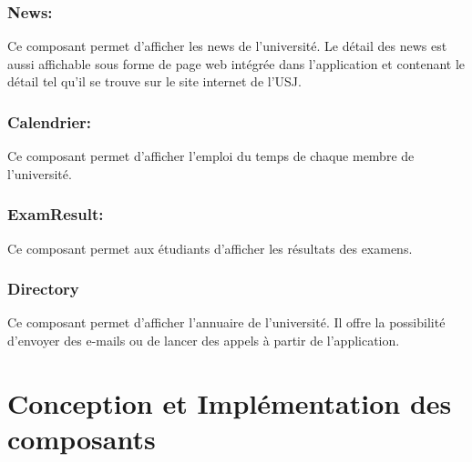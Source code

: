		\subsubsection*{News:}
		Ce composant permet d'afficher les news de l'université. Le détail des news est aussi affichable sous forme de page web intégrée dans l'application et contenant le détail tel qu'il se trouve sur le site internet de l'USJ. 
		\subsubsection*{Calendrier:}
		Ce composant permet d'afficher l'emploi du temps de chaque membre de l'université. 
		\subsubsection*{ExamResult:}
		Ce composant permet aux étudiants d'afficher les résultats des examens.
		\subsubsection*{Directory}
		Ce composant permet d'afficher l'annuaire de l'université. Il offre la possibilité d'envoyer des e-mails ou de lancer des appels à partir de l'application.




\section{Conception et Implémentation des composants}
